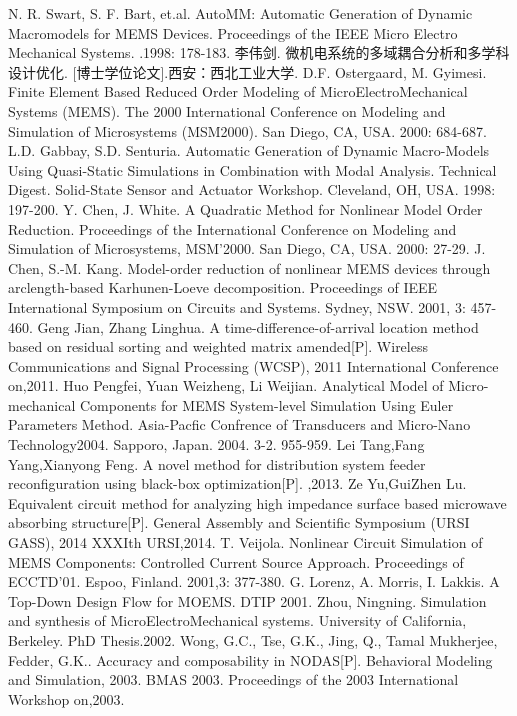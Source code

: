 \documentclass[no-math]{YangThesis}
\begin{document}
\begin{thebibliography}{9}
  N. R. Swart, S. F. Bart, et.al. AutoMM: Automatic Generation of Dynamic Macromodels for MEMS Devices. Proceedings of the IEEE Micro Electro Mechanical Systems. .1998: 178-183.
  李伟剑. 微机电系统的多域耦合分析和多学科设计优化. [博士学位论文].西安：西北工业大学.
 D.F. Ostergaard, M. Gyimesi. Finite Element Based Reduced Order Modeling of MicroElectroMechanical Systems (MEMS). The 2000 International Conference on Modeling and Simulation of Microsystems (MSM2000). San Diego, CA, USA. 2000: 684-687.
  L.D. Gabbay, S.D. Senturia. Automatic Generation of Dynamic Macro-Models Using Quasi-Static Simulations in Combination with Modal Analysis. Technical Digest. Solid-State Sensor and Actuator Workshop. Cleveland, OH, USA. 1998: 197-200.
  Y. Chen, J. White. A Quadratic Method for Nonlinear Model Order Reduction. Proceedings of the International Conference on Modeling and Simulation of Microsystems, MSM’2000. San Diego, CA, USA. 2000: 27-29.
  J. Chen, S.-M. Kang. Model-order reduction of nonlinear MEMS devices through arclength-based Karhunen-Loeve decomposition. Proceedings of IEEE International Symposium on Circuits and Systems. Sydney, NSW. 2001, 3: 457-460.
  Geng Jian, Zhang Linghua. A time-difference-of-arrival location method based on residual sorting and weighted matrix amended[P]. Wireless Communications and Signal Processing (WCSP), 2011 International Conference on,2011.
  Huo Pengfei, Yuan Weizheng, Li Weijian. Analytical Model of Micro-mechanical Components for MEMS System-level Simulation Using Euler Parameters Method. Asia-Pacfic Confrence of Transducers and Micro-Nano Technology2004. Sapporo, Japan. 2004. 3-2. 955-959.
  Lei Tang,Fang Yang,Xianyong Feng. A novel method for distribution system feeder reconfiguration using black-box optimization[P]. ,2013.
  Ze Yu,GuiZhen Lu. Equivalent circuit method for analyzing high impedance surface based microwave absorbing structure[P]. General Assembly and Scientific Symposium (URSI GASS), 2014 XXXIth URSI,2014.
  T. Veijola. Nonlinear Circuit Simulation of MEMS Components: Controlled Current Source Approach. Proceedings of ECCTD'01. Espoo, Finland. 2001,3: 377-380.
  G. Lorenz, A. Morris, I. Lakkis. A Top-Down Design Flow for MOEMS. DTIP 2001.
  Zhou, Ningning. Simulation and synthesis of MicroElectroMechanical systems. University of California, Berkeley. PhD Thesis.2002.
  Wong, G.C., Tse, G.K., Jing, Q., Tamal Mukherjee, Fedder, G.K.. Accuracy and composability in NODAS[P]. Behavioral Modeling and Simulation, 2003. BMAS 2003. Proceedings of the 2003 International Workshop on,2003.

\end{thebibliography}
\end{document}
